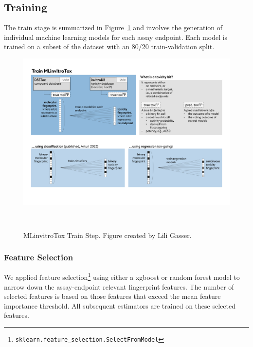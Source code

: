 \subsection{Training}
The train stage is summarized in Figure~\ref{fig:Project_overview_train} and involves the generation of individual machine learning models for each assay endpoint. Each model is trained on a subset of the dataset with an 80/20 train-validation split. 

\begin{figure} 
    \centering
    \includegraphics[width=1.0\textwidth]{figures/Project_overview_train.png}
    \caption{MLinvitroTox Train Step. Figure created by Lili Gasser.}
~\label{fig:Project_overview_train}
\end{figure}

\subsubsection{Feature Selection}
We applied feature selection\footnote{\texttt{sklearn.feature\_selection.SelectFromModel}} using either a xgboost or random forest model to narrow down the assay-endpoint relevant fingerprint features. The number of selected features is based on those features that exceed the mean feature importance threshold. All subsequent estimators are trained on these selected features.

